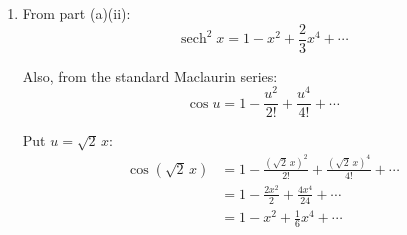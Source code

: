 \documentclass[leqno]{article}
\begin{document}
\begin{enumerate}[
  label=\textbf{\arabic*.},
  leftmargin=*,
  topsep=0pt,
  partopsep=0pt,
  parsep=0pt
]
\begin{djsSolution}
\begin{enumerate}[label=\textbf{(\alph*)}]
\begin{enumerate}[label=(\roman*)]
    Now evaluate at \(x=0\). Since \(\operatorname{sech}0=1\) and \(\tanh 0=0\), we have
    \[
    f(0)=1
    \]
    \[
    f'(0)=-2f(0)\tanh 0=0
    \]
    \[
    f''(0)=4f(0)-6f(0)^2=4-6=-2
    \]

    Differentiate \(f''=4f-6f^2\):
    \[
    f'''=4f'-12ff'
    \]

    so
    \[
    f'''(0)=4f'(0)-12f(0)f'(0)=0
    \]

    Differentiate once more:
    \[
    f^{(4)}=4f''-12\bigl((f')^2+ff''\bigr)
    \]

    Hence
    \begin{align*}
    f^{(4)}(0)
    &= 4f''(0)-12\bigl((f'(0))^2+f(0)f''(0)\bigr) \\
    &= 4(-2)-12\bigl(0+1(-2)\bigr) \\
    &= -8+24 \\
    &= 16
    \end{align*}

    \item The Maclaurin series for \(f(x)\) is
    \[
    f(x)=f(0)+xf'(0)+\frac{x^2}{2!}f''(0)+\frac{x^3}{3!}f'''(0)+\frac{x^4}{4!}f^{(4)}(0)+\cdots
    \]

    Substituting the values found in part (a)(i):
    \begin{align*}
    f(x)
    &= 1+x(0)+\frac{x^2}{2!}(-2)+\frac{x^3}{3!}(0)+\frac{x^4}{4!}(16)+\cdots \\
    &= 1-x^2+\frac{16}{24}x^4+\cdots \\
    &= 1-x^2+\frac{2}{3}x^4+\cdots
    \end{align*}

    So the first three non-zero terms are
    \[
    \operatorname{sech}^2x=1-x^2+\frac{2}{3}x^4+\cdots
    \]
  \end{enumerate}

  \item From part (a)(ii):
  \[
  \operatorname{sech}^2x=1-x^2+\frac{2}{3}x^4+\cdots
  \]

  Also, from the standard Maclaurin series:
  \[
  \cos u=1-\frac{u^2}{2!}+\frac{u^4}{4!}+\cdots
  \]

  Put \(u=\sqrt{2}\,x\):
  \begin{align*}
  \cos(\sqrt{2}\,x)
  &= 1-\frac{(\sqrt{2}\,x)^2}{2!}+\frac{(\sqrt{2}\,x)^4}{4!}+\cdots \\
  &= 1-\frac{2x^2}{2}+\frac{4x^4}{24}+\cdots \\
  &= 1-x^2+\frac{1}{6}x^4+\cdots
  \end{align*}


\end{enumerate}
\end{djsSolution}
\end{enumerate}
\end{document}
